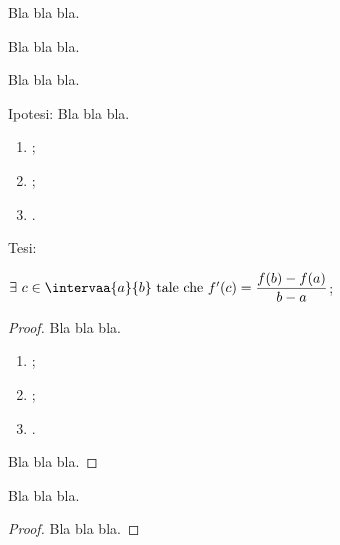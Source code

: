 \begin{definizione}
Bla bla bla.
\end{definizione}

\begin{esempio}
 Bla bla bla.
 
\end{esempio}

\begin{teorema}[Teorema di ...]
Bla bla bla.
\end{teorema}

\noindent Ipotesi:
 Bla bla bla.
\begin{enumerate}[nosep]
 \item ;
 \item ;
 \item .
\end{enumerate}

\noindent Tesi: 

\(\exists~c \in \intervaa{a}{b}\text{ tale che }f'(c)=\dfrac{f(b)-f(a)}{b-a}\);

\begin{proof}
Bla bla bla.
\begin{enumerate}[nosep]
 \item ;
 \item ;
 \item .
\end{enumerate}
 
 Bla bla bla.
\end{proof}

\begin{corollario}
 Bla bla bla.
\end{corollario}
% 

\begin{proof}
Bla bla bla.
\end{proof}












